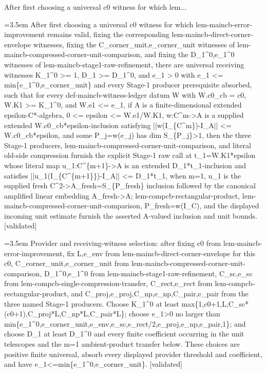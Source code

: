 \documentclass{article}
\newcommand{\step}[1]{\par\noindent\hangindent=3.5em\hangafter=1%
  \makebox[3.5em][l]{\textbf{#1.}}}
\newcommand{\steptag}[1]{\hfill{\small\textsf{[#1]}}}
\begin{document}
\begin{proofbox}{After first choosing a universal c0 witness for which lem...}
\step{1} After first choosing a universal c0 witness for which lem-maincb-error-improvement remains valid, fixing the corresponding lem-maincb-direct-corner-envelope witnesses, fixing the C\_corner\_unit,e\_corner\_unit witnesses of lem-maincb-compressed-corner-unit-comparison, and fixing the D\_1\textasciicircum{}0,e\_1\textasciicircum{}0 witnesses of lem-maincb-stage1-raw-refinement, there are universal receiving witnesses K\_1\textasciicircum{}0 >= 1, D\_1 >= D\_1\textasciicircum{}0, and e\_1 > 0 with e\_1 <= min\{e\_1\textasciicircum{}0,e\_corner\_unit\} and every Stage-1 producer prerequisite absorbed, such that for every def-maincb-witness-ledger datum W with W.c0\_cb = c0, W.K1 >= K\_1\textasciicircum{}0, and W.e1 <= e\_1, if A is a finite-dimensional extended epsilon-C*-algebra, 0 <= epsilon <= W.e1/W.K1, w:C\textasciicircum{}m->A is a supplied extended W.c0\_cb*epsilon-inclusion satisfying ||w(I\_\{C\textasciicircum{}m\})-I\_A|| <= W.c0\_cb*epsilon, and some P\_j=w(e\_j) has dim S\_\{P\_j\}>1, then the three Stage-1 producers, lem-maincb-compressed-corner-unit-comparison, and literal old-side compression furnish the explicit Stage-1 raw call at t\_1=W.K1*epsilon whose literal map u\_1:C\textasciicircum{}\{m+1\}->A is an extended D\_1*t\_1-inclusion and satisfies ||u\_1(I\_\{C\textasciicircum{}\{m+1\}\})-I\_A|| <= D\_1*t\_1, when m=1, u\_1 is the supplied fresh C\textasciicircum{}2->A\_fresh=S\_\{P\_fresh\} inclusion followed by the canonical amplified linear embedding A\_fresh->A; lem-compcb-rectangular-product, lem-maincb-compressed-corner-unit-comparison, P\_fresh=w(I\_C), and the displayed incoming unit estimate furnish the asserted A-valued inclusion and unit bounds. \steptag{validated} \\[6pt]
\step{1.1} Provider and receiving-witness selection: after fixing c0 from lem-maincb-error-improvement, fix L,e\_env from lem-maincb-direct-corner-envelope for this c0, C\_corner\_unit,e\_corner\_unit from lem-maincb-compressed-corner-unit-comparison, D\_1\textasciicircum{}0,e\_1\textasciicircum{}0 from lem-maincb-stage1-raw-refinement, C\_sc,e\_sc from lem-compcb-single-compression-transfer, C\_rect,e\_rect from lem-compcb-rectangular-product, and C\_proj,e\_proj,C\_np,e\_np,C\_pair,e\_pair from the three named Stage-1 producers. Choose K\_1\textasciicircum{}0 at least max\{1,c0+1,L,C\_sc*(c0+1),C\_proj*L,C\_np*L,C\_pair*L\}; choose e\_1>0 no larger than min\{e\_1\textasciicircum{}0,e\_corner\_unit,e\_env,e\_sc,e\_rect/2,e\_proj,e\_np,e\_pair,1\}; and choose D\_1 at least D\_1\textasciicircum{}0 and every finite coefficient occurring in the unit telescopes and the m=1 ambient-product transfer below. These choices are positive finite universal, absorb every displayed provider threshold and coefficient, and have e\_1<=min\{e\_1\textasciicircum{}0,e\_corner\_unit\}. \steptag{validated} \\[4pt]

\end{proofbox}
\end{document}
